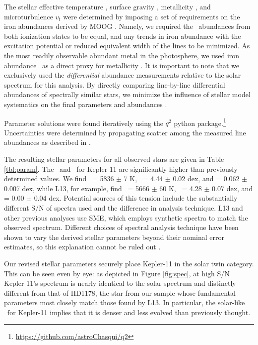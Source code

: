 \documentclass[oneside]{emulateapj}
\begin{document}
The stellar effective temperature \teff, surface gravity \logg, metallicity \mh, and microturbulence $v_t$ were determined by imposing a set of requirements on the iron abundances derived by MOOG \citep{Sneden1973}. Namely, we required the \feh\ abundances from both ionization states to be equal, and any trends in iron abundance with the excitation potential or reduced equivalent width of the lines to be minimized. As the most readily observable abundant metal in the photosphere, we used iron abundance \feh\ as a direct proxy for metallicity \mh. It is important to note that we exclusively used the \textit{differential} abundance measurements relative to the solar spectrum for this analysis. By directly comparing line-by-line differential abundances of spectrally similar stars, we minimize the influence of stellar model systematics on the final parameters and abundances \citep[see e.g.][]{Ramirez2014}. 

Parameter solutions were found iteratively using the $q^2$ python package.\footnote{\url{https://github.com/astroChasqui/q2}} Uncertainties were determined by propagating scatter among the measured line abundances as described in \citet{Epstein2010, Bensby2014}.

The resulting stellar parameters for all observed stars are given in Table \ref{tbl:param}. The \teff\ and \logg\ for Kepler-11 are significantly higher than previously determined values. We find \teff\ = 5836 $\pm$ 7 K, \logg\ = 4.44 $\pm$ 0.02 dex, and \feh = 0.062 $\pm$ 0.007 dex, while L13, for example, find \teff\ = 5666 $\pm$ 60 K, \logg\ = 4.28 $\pm$ 0.07 dex, and \feh = 0.00 $\pm$ 0.04 dex. Potential sources of this tension include the substantially different S/N of spectra used and the difference in analysis technique. L13 and other previous analyses use SME, which employs synthetic spectra to match the observed spectrum. Different choices of spectral analysis technique have been shown to vary the derived stellar parameters beyond their nominal error estimates, so this explanation cannot be ruled out \citep{Hinkel2016}.

Our revised stellar parameters securely place Kepler-11 in the solar twin category. This can be seen even by eye: as depicted in Figure \ref{fig:spec}, at high S/N Kepler-11's spectrum is nearly identical to the solar spectrum and distinctly different from that of HD1178, the star from our sample whose fundamental parameters most closely match those found by L13. In particular, the solar-like \logg\ for Kepler-11 implies that it is denser and less evolved than previously thought.
\end{document}
